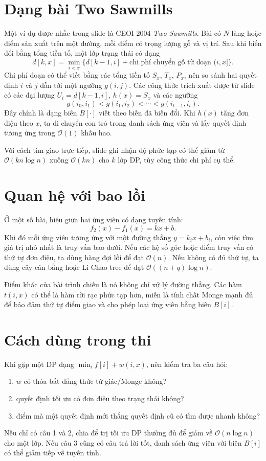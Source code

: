\documentclass[11pt]{article}
\newcommand{\Oh}{\mathcal{O}}
\begin{document}
\section{Dạng bài Two Sawmills}

Một ví dụ được nhắc trong slide là CEOI 2004 \textit{Two Sawmills}. Bài có
\(N\) làng hoặc điểm sản xuất trên một đường, mỗi điểm có trọng lượng gỗ và
vị trí. Sau khi biến đổi bằng tổng tiền tố, một lớp trạng thái có dạng
\[
  d[k,x]=\min_{i<x}\{d[k-1,i]+\text{chi phí chuyển gỗ từ đoạn }(i,x]\}.
\]
Chi phí đoạn có thể viết bằng các tổng tiền tố \(S_x\), \(T_x\), \(P_x\), nên
so sánh hai quyết định \(i\) và \(j\) dẫn tới một ngưỡng \(g(i,j)\). Các công
thức trích xuất được từ slide có các đại lượng \(U_i=d[k-1,i]\), \(h(x)=S_x\)
và các ngưỡng
\[
  g(i_0,i_1)<g(i_1,i_2)<\cdots<g(i_{l-1},i_l).
\]
Đây chính là dạng biên \(B[\cdot]\) viết theo biến đã biến đổi. Khi
\(h(x)\) tăng đơn điệu theo \(x\), ta di chuyển con trỏ trong danh sách ứng
viên và lấy quyết định tương ứng trong \(\Oh(1)\) khấu hao.

Với cách tìm giao trực tiếp, slide ghi nhận độ phức tạp có thể giảm từ
\(\Oh(kn\log n)\) xuống \(\Oh(kn)\) cho \(k\) lớp DP, tùy công thức chi phí
cụ thể.

\section{Quan hệ với bao lồi}

Ở một số bài, hiệu giữa hai ứng viên có dạng tuyến tính:
\[
  f_2(x)-f_1(x)=kx+b.
\]
Khi đó mỗi ứng viên tương ứng với một đường thẳng \(y=k_ix+b_i\), còn việc
tìm giá trị nhỏ nhất là truy vấn bao dưới. Nếu các hệ số góc hoặc điểm truy
vấn có thứ tự đơn điệu, ta dùng hàng đợi lồi để đạt \(\Oh(n)\). Nếu không có
đủ thứ tự, ta dùng cây cân bằng hoặc Li Chao tree để đạt
\(\Oh((n+q)\log n)\).

Điểm khác của bài trình chiếu là nó không chỉ xử lý đường thẳng. Các hàm
\(t(i,x)\) có thể là hàm rời rạc phức tạp hơn, miễn là tính chất Monge mạnh
đủ để bảo đảm thứ tự điểm giao và cho phép loại ứng viên bằng biên \(B[i]\).

\section{Cách dùng trong thi}

Khi gặp một DP dạng \(\min_i f[i]+w(i,x)\), nên kiểm tra ba câu hỏi:
\begin{enumerate}
  \item \(w\) có thỏa bất đẳng thức tứ giác/Monge không?
  \item quyết định tối ưu có đơn điệu theo trạng thái không?
  \item điểm mà một quyết định mới thắng quyết định cũ có tìm được nhanh
  không?
\end{enumerate}
Nếu chỉ có câu 1 và 2, chia để trị tối ưu DP thường đủ để giảm về
\(\Oh(n\log n)\) cho một lớp. Nếu câu 3 cũng có câu trả lời tốt, danh sách
ứng viên với biên \(B[i]\) có thể giảm tiếp về tuyến tính.
\end{document}
